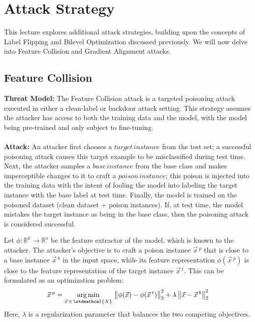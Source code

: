 \documentclass[11pt]{report}
\theoremstyle{remark}
\begin{document}

\maketitle



\section{Attack Strategy}
This lecture explores additional attack strategies, building upon the concepts of Label Flipping and Bilevel Optimization discussed previously. We will now delve into Feature Collision and Gradient Alignment attacks.

\subsection{Feature Collision}
\textbf{Threat Model:} The Feature Collision attack is a targeted poisoning attack executed in either a clean-label or backdoor  attack setting. This strategy assumes the attacker has access to both the training data and the model, with the model being pre-trained and only subject to fine-tuning.\\
\\
\textbf{Attack:} An attacker first chooses a $target\, instance$ from the test set; a successful poisoning attack causes this target example to be misclassified during test time. Next, the attacker samples a $base\, instance$ from
the base class and makes imperceptible changes to it to craft a $poison\, instance$; this poison is injected into the training data with the intent of fooling the model into labeling the target instance with the base label at test time. Finally, the model is trained on the poisoned dataset (clean dataset + poison instances). If, at test time, the model mistakes the target instance as being in the base class, then the poisoning attack is considered successful.

Let $\phi: \mathbb{R}^k \rightarrow \mathbb{R}^s$ be the feature extractor of the model, which is known to the attacker. The attacker's objective is to craft a poison instance $\Vec{x}\,^p$ that is close to a base instance $\Vec{x}\,^b$ in the input space, while its feature representation $\phi(\Vec{x}\,^p)$ is close to the feature representation of the target instance $\Vec{x}\,^t$. This can be formulated as an optimization problem:
\[\Vec{x}\,^p = \argmin_{\Vec{x}\,\in \,\stdmathcal{X}} \, \norm{\phi(\Vec{x})-\phi(\Vec{x}\,^{t})}^2_2 + \lambda\norm{\Vec{x}-\Vec{x}\,^b}^2_2\]
Here, $\lambda$ is a regularization parameter that balances the two competing objectives.
\end{document}
